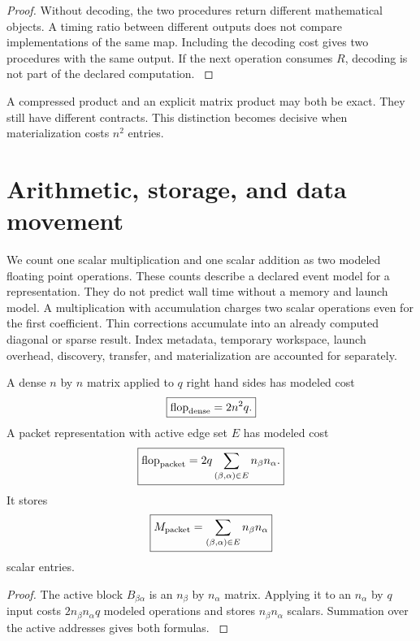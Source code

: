 \begin{proof}\label{main:proof:004}
Without decoding, the two procedures return different mathematical objects. A timing ratio between different outputs does not compare implementations of the same map. Including the decoding cost gives two procedures with the same output. If the next operation consumes \(R\), decoding is not part of the declared computation.
\label{main:proof:004:end}\end{proof}

\begin{remark}\label{main:remark:001}\label{rem:semantic_boundary}
A compressed product and an explicit matrix product may both be exact. They still have different contracts. This distinction becomes decisive when materialization costs \(n^2\) entries.
\end{remark}

\section{Arithmetic, storage, and data movement}\label{main:section:003}\label{sec:cost}

We count one scalar multiplication and one scalar addition as two modeled floating point operations. These counts describe a declared event model for a representation. They do not predict wall time without a memory and launch model. A multiplication with accumulation charges two scalar operations even for the first coefficient. Thin corrections accumulate into an already computed diagonal or sparse result. Index metadata, temporary workspace, launch overhead, discovery, transfer, and materialization are accounted for separately.

\begin{theorem}\label{main:theorem:003}\label{thm:packet_counts}
A dense \(n\) by \(n\) matrix applied to \(q\) right hand sides has modeled cost
\[
\boxed{
\operatorname{flop}_{\rm dense}=2n^2q.
}
\]
A packet representation with active edge set \(E\) has modeled cost
\[
\boxed{
\operatorname{flop}_{\rm packet}
=
2q
\sum_{(\beta,\alpha)\in E}
n_\beta n_\alpha.
}
\]
It stores
\[
\boxed{
M_{\rm packet}
=
\sum_{(\beta,\alpha)\in E}
n_\beta n_\alpha
}
\]
scalar entries.
\end{theorem}

\begin{proof}\label{main:proof:005}
The active block \(B_{\beta\alpha}\) is an \(n_\beta\) by \(n_\alpha\) matrix. Applying it to an \(n_\alpha\) by \(q\) input costs \(2n_\beta n_\alpha q\) modeled operations and stores \(n_\beta n_\alpha\) scalars. Summation over the active addresses gives both formulas.
\label{main:proof:005:end}\end{proof}

